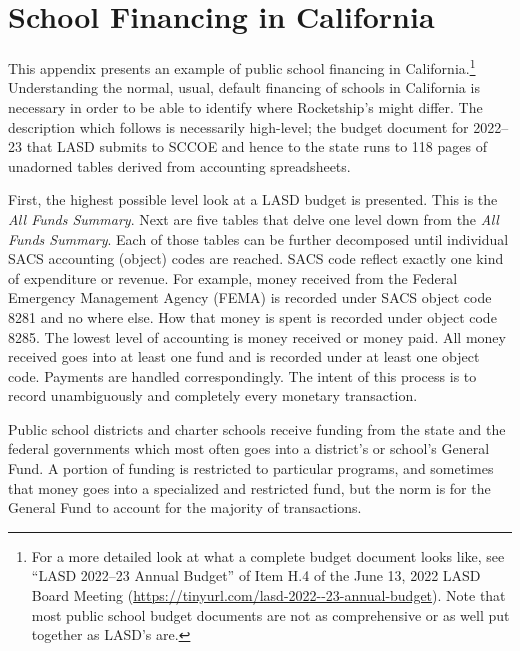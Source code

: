 
\chapter{School Financing in California}\label{ch:ca-school-financing}

This appendix presents an example of public school financing in California.\footnote{For a more detailed look at what a complete budget document looks like, see ``LASD 2022–23 Annual Budget'' of Item H.4 of the June 13, 2022 LASD Board Meeting (\url{https://tinyurl.com/lasd-2022--23-annual-budget}). Note that most public school budget documents are not as comprehensive or as well put together as LASD's are.} %
Understanding the normal, usual, default financing of schools in California is necessary in order to be able to identify where Rocketship's might differ. The description which follows is necessarily high-level; the budget document for 2022–23 that LASD submits to SCCOE and hence to the state runs to 118 pages of unadorned tables derived from accounting spreadsheets.

First, the highest possible level look at a LASD budget is presented. This is the \textit{All Funds Summary}. Next are five tables that delve one level down from the \textit{All Funds Summary}. Each of those tables can be further decomposed until individual SACS accounting (object) codes are reached. SACS code reflect exactly one kind of expenditure or revenue. For example, money received from the Federal Emergency Management Agency (FEMA) is recorded under SACS object code 8281 and no where else. How that money is spent is recorded under object code 8285. The lowest level of accounting is money received or money paid. All money received goes into at least one fund and is recorded under at least one object code. Payments are handled correspondingly. The intent of this process is to record unambiguously and completely every monetary transaction. 

Public school districts and charter schools receive funding from the state and the federal governments which most often goes into a district's or school's General Fund. A portion of funding is restricted to particular programs, and sometimes that money goes into a specialized and restricted fund, but the norm is for the General Fund to account for the majority of transactions.

